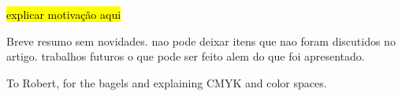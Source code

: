 \documentclass[sigconf]{acmart}
\newcommand{\pending}[1]{\hl{#1}} %
\begin{document}
\pending{explicar motivação aqui}

Breve resumo sem novidades. nao pode deixar itens que nao foram discutidos no artigo. 
trabalhos futuros o que pode ser feito alem do que foi apresentado.



\begin{acks}
To Robert, for the bagels and explaining CMYK and color spaces.
\end{acks}



\end{document}
